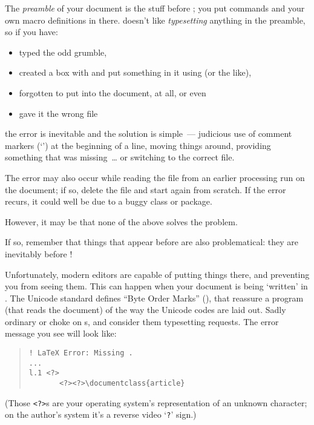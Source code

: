 {

The \emph{preamble} of your document is the stuff before
; you put  commands and
your own macro definitions in there.  \latex{} doesn't like
\emph{typesetting} anything in the preamble, so if you have:
\begin{itemize}
\item typed the odd grumble,
\item created a box with  and put something in it
  using  (or the like),
\item forgotten to put  into the document,
  at all, or even
\item gave it the wrong file
\end{itemize}
the error is inevitable and the solution is simple~--- judicious use
of comment markers (`\texttt{\textpercent{}}') at the beginning of a
line, moving things around, providing something that was
missing~\dots{} or switching to the correct file.

The error may also occur while reading the  file from an
earlier processing run on the document; if so, delete the
 file and start again from scratch.  If the error
recurs, it could well be due to a buggy class or package.

However, it may be that none of the above solves the problem.

If so, remember that things that appear before  are
also problematical: they are inevitably before
!

Unfortunately, modern editors are capable of putting things there, and
preventing you from seeing them.  This can happen when your document
is being `written' in .  The Unicode
standard defines ``Byte Order Marks'' (), that reassure a
program (that reads the document) of the way the Unicode codes are
laid out.  Sadly ordinary \latex{} or \pdflatex{} choke on
s, and consider them typesetting requests.  The error
message you see will look like:
\begin{quote}
\begin{verbatim}
! LaTeX Error: Missing .
...
l.1 <?>
       <?><?>\documentclass{article}
\end{verbatim}
\end{quote}
(Those \texttt{<?>}s are your operating system's representation of an
unknown character; on the author's system it's a reverse video
`\texttt{?}' sign.)

}
